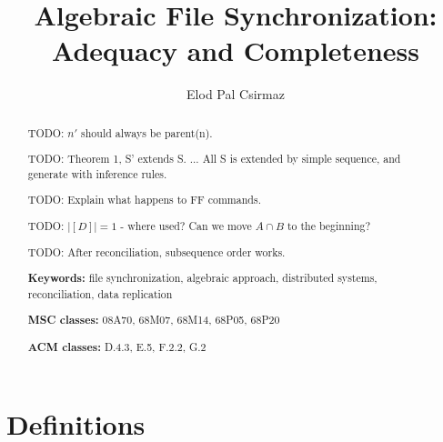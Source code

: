 \documentclass[12pt]{article}
\title{Algebraic File Synchronization: Adequacy and Completeness}
\author{Elod Pal Csirmaz\\
\texttt{\rot{\rot{maz.}{csir}{ep}com}{@}{elod}}}
\date{}
\begin{document}
\maketitle
\begin{abstract}

TODO: $n'$ should always be parent(n).

TODO: Theorem 1, S' extends S. ... All S is extended by simple sequence, and generate with inference rules.

TODO: Explain what happens to FF commands.

TODO: $|[D]|=1$ - where used? Can we move $A \cap B$ to the beginning?


TODO: After reconciliation, subsequence order works.



\bigskip\noindent
{\bf Keywords:} %
file synchronization,
algebraic approach,
distributed systems,
reconciliation,
data replication

\bigskip\noindent
{\bf MSC classes:} %
08A70, %
68M07, %
68M14, %
68P05, %
68P20 %

\bigskip\noindent
{\bf ACM classes:} %
D.4.3, %
E.5, %
F.2.2, %
G.2 %

\end{abstract}



\section{Definitions}


\end{document}
